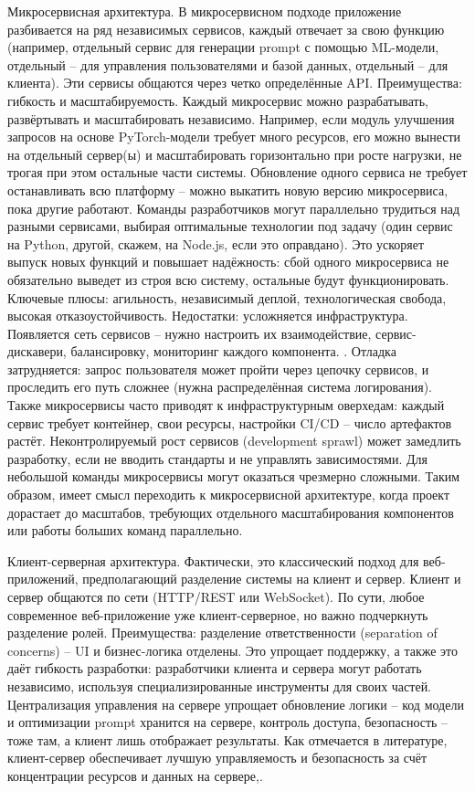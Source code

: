 Микросервисная архитектура. В микросервисном подходе приложение разбивается на ряд независимых сервисов, каждый отвечает за свою функцию (например, отдельный сервис для генерации prompt с помощью ML-модели, отдельный – для управления пользователями и базой данных, отдельный – для клиента). Эти сервисы общаются через четко определённые API. Преимущества: гибкость и масштабируемость. Каждый микросервис можно разрабатывать, развёртывать и масштабировать независимо\cite{atlassian:microservices}. Например, если модуль улучшения запросов на основе PyTorch-модели требует много ресурсов, его можно вынести на отдельный сервер(ы) и масштабировать горизонтально при росте нагрузки, не трогая при этом остальные части системы. Обновление одного сервиса не требует останавливать всю платформу – можно выкатить новую версию микросервиса, пока другие работают. Команды разработчиков могут параллельно трудиться над разными сервисами, выбирая оптимальные технологии под задачу (один сервис на Python, другой, скажем, на Node.js, если это оправдано)\cite{atlassian:microservices}. Это ускоряет выпуск новых функций и повышает надёжность: сбой одного микросервиса не обязательно выведет из строя всю систему, остальные будут функционировать. Ключевые плюсы: агильность, независимый деплой, технологическая свобода, высокая отказоустойчивость\cite{atlassian:microservices}. Недостатки: усложняется инфраструктура. Появляется сеть сервисов – нужно настроить их взаимодействие, сервис-дискавери, балансировку, мониторинг каждого компонента\cite{atlassian:microservices}. . Отладка затрудняется: запрос пользователя может пройти через цепочку сервисов, и проследить его путь сложнее (нужна распределённая система логирования). Также микросервисы часто приводят к инфраструктурным оверхедам: каждый сервис требует контейнер, свои ресурсы, настройки CI/CD – число артефактов растёт\cite{atlassian:microservices}. Неконтролируемый рост сервисов (development sprawl) может замедлить разработку, если не вводить стандарты и не управлять зависимостями\cite{atlassian:microservices}. Для небольшой команды микросервисы могут оказаться чрезмерно сложными. Таким образом, имеет смысл переходить к микросервисной архитектуре, когда проект дорастает до масштабов, требующих отдельного масштабирования компонентов или работы больших команд параллельно. 

Клиент-серверная архитектура. Фактически, это классический подход для веб-приложений, предполагающий разделение системы на клиент и сервер. Клиент и сервер общаются по сети (HTTP/REST или WebSocket). По сути, любое современное веб-приложение уже клиент-серверное, но важно подчеркнуть разделение ролей. Преимущества: разделение ответственности (separation of concerns) – UI и бизнес-логика отделены. Это упрощает поддержку, а также это даёт гибкость разработки: разработчики клиента и сервера могут работать независимо, используя специализированные инструменты для своих частей. Централизация управления на сервере упрощает обновление логики – код модели и оптимизации prompt хранится на сервере, контроль доступа, безопасность – тоже там, а клиент лишь отображает результаты. Как отмечается в литературе, клиент-сервер обеспечивает лучшую управляемость и безопасность за счёт концентрации ресурсов и данных на сервере\cite{kitrum:clientserver},\cite{enjoyalgorithms:clientserver}.


